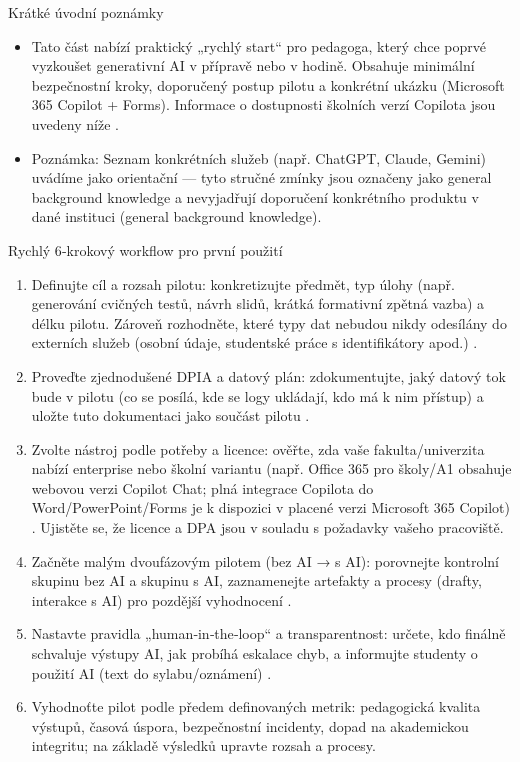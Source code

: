 Krátké úvodní poznámky
\begin{itemize}
  \item Tato část nabízí praktický „rychlý start“ pro pedagoga, který chce poprvé vyzkoušet generativní AI v přípravě nebo v hodině. Obsahuje minimální bezpečnostní kroky, doporučený postup pilotu a konkrétní ukázku (Microsoft 365 Copilot + Forms). Informace o dostupnosti školních verzí Copilota jsou uvedeny níže \cite{kb_ai_101_tipu_pdf_04e4a115_page_3_1,kb_ai_101_tipu_pdf_04e4a115_page_36_1}.
  \item Poznámka: Seznam konkrétních služeb (např. ChatGPT, Claude, Gemini) uvádíme jako orientační — tyto stručné zmínky jsou označeny jako general background knowledge a nevyjadřují doporučení konkrétního produktu v dané instituci (general background knowledge).
\end{itemize}

Rychlý 6‑krokový workflow pro první použití
\begin{enumerate}
  \item Definujte cíl a rozsah pilotu: konkretizujte předmět, typ úlohy (např. generování cvičných testů, návrh slidů, krátká formativní zpětná vazba) a délku pilotu. Zároveň rozhodněte, které typy dat nebudou nikdy odesílány do externích služeb (osobní údaje, studentské práce s identifikátory apod.) \cite{kb_malinka_chatgpt_ve_vyuce_dva_roky_pote_2024_pdf_90bc3aaf_page_12_1}.
  \item Proveďte zjednodušené DPIA a datový plán: zdokumentujte, jaký datový tok bude v pilotu (co se posílá, kde se logy ukládají, kdo má k nim přístup) a uložte tuto dokumentaci jako součást pilotu \cite{kb_malinka_chatgpt_ve_vyuce_dva_roky_pote_2024_pdf_90bc3aaf_page_12_1}.
  \item Zvolte nástroj podle potřeby a licence: ověřte, zda vaše fakulta/univerzita nabízí enterprise nebo školní variantu (např. Office 365 pro školy/A1 obsahuje webovou verzi Copilot Chat; plná integrace Copilota do Word/PowerPoint/Forms je k dispozici v placené verzi Microsoft 365 Copilot) \cite{kb_ai_101_tipu_pdf_04e4a115_page_3_1}. Ujistěte se, že licence a DPA jsou v souladu s požadavky vašeho pracoviště.
  \item Začněte malým dvoufázovým pilotem (bez AI → s AI): porovnejte kontrolní skupinu bez AI a skupinu s AI, zaznamenejte artefakty a procesy (drafty, interakce s AI) pro pozdější vyhodnocení \cite{kb_malinka_chatgpt_ve_vyuce_dva_roky_pote_2024_pdf_90bc3aaf_page_12_1}.
  \item Nastavte pravidla „human‑in‑the‑loop“ a transparentnost: určete, kdo finálně schvaluje výstupy AI, jak probíhá eskalace chyb, a informujte studenty o použití AI (text do sylabu/oznámení) \cite{kb_malinka_chatgpt_ve_vyuce_dva_roky_pote_2024_pdf_90bc3aaf_page_12_1}.
  \item Vyhodnoťte pilot podle předem definovaných metrik: pedagogická kvalita výstupů, časová úspora, bezpečnostní incidenty, dopad na akademickou integritu; na základě výsledků upravte rozsah a procesy.
\end{enumerate}

